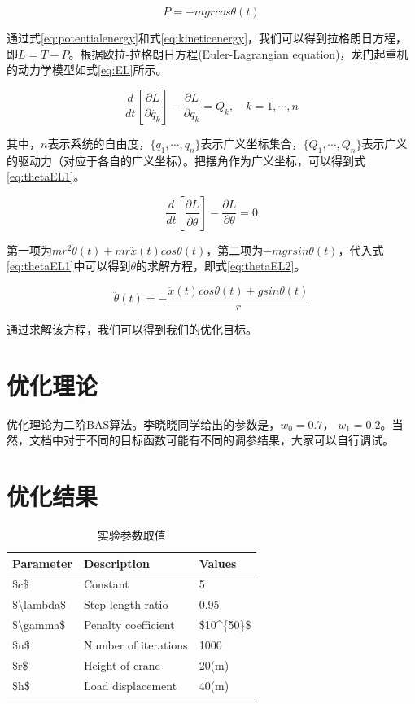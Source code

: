 \documentclass[]{ctexbook}
\theoremstyle{definition}
\theoremstyle{definition}
\theoremstyle{definition}
\theoremstyle{remark}
\begin{document}
\begin{equation}
P = -mgrcos\theta(t)
\label{eq:potentialenergy}
\end{equation}

通过式\eqref{eq:potentialenergy}和式\eqref{eq:kineticenergy}，我们可以得到拉格朗日方程，即\(L = T -P\)。根据欧拉-拉格朗日方程(Euler-Lagrangian
equation)，龙门起重机的动力学模型如式\eqref{eq:EL}所示。

\begin{equation}
\frac{d}{dt}[\frac{\partial{L}}{\partial{\dot{q_k}}}] - \frac{\partial{L}}{\partial{q_k}}=Q_k, \quad k=1,\cdots,n
\label{eq:EL}
\end{equation}

其中，\(n\)表示系统的自由度，\(\{q_1,\cdots,q_n\}\)表示广义坐标集合，\(\{Q_1,\cdots,Q_n\}\)表示广义的驱动力（对应于各自的广义坐标）。把摆角作为广义坐标，可以得到式\eqref{eq:thetaEL1}。

\begin{equation}
\frac{d}{dt}[\frac{\partial{L}}{\partial{\dot{\theta}}}] - \frac{\partial{L}}{\partial{\theta}}=0
\label{eq:thetaEL1}
\end{equation}

第一项为\(mr^2\ddot{\theta}(t)+mr\ddot{x}(t)cos\theta(t)\)，第二项为\(-mgrsin\theta(t)\)，代入式\eqref{eq:thetaEL1}中可以得到\(\theta\)的求解方程，即式\eqref{eq:thetaEL2}。

\begin{equation}
\ddot{\theta}(t)=-\frac{\ddot{x}(t)cos\theta(t)+gsin\theta(t)}{r}
\label{eq:thetaEL2}
\end{equation}

通过求解该方程，我们可以得到我们的优化目标。

\section{优化理论}\label{-1}

优化理论为二阶BAS算法。李晓晓同学给出的参数是，\(w_0 = 0.7\)，
\(w_1 = 0.2\)。当然，文档中对于不同的目标函数可能有不同的调参结果，大家可以自行调试。

\section{优化结果}\label{-1}

\begin{table}

\caption{\label{tab:example2parms}实验参数取值}
\centering
\begin{tabular}[t]{lll}
\toprule
Parameter & Description & Values\\
\midrule
\$c\$ & Constant & 5\\
\$\textbackslash{}lambda\$ & Step length ratio & 0.95\\
\$\textbackslash{}gamma\$ & Penalty coefficient & \$10\textasciicircum{}\{50\}\$\\
\$n\$ & Number of iterations & 1000\\
\$r\$ & Height of crane & 20(m)\\
\$h\$ & Load displacement & 40(m)\\
\bottomrule
\end{tabular}
\end{table}
\end{document}
